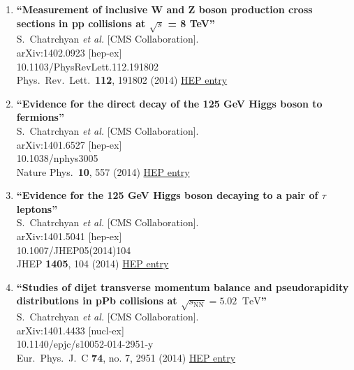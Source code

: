 \documentclass{article}
\begin{document}
\begin{enumerate}
\item%
{\bf ``Measurement of inclusive W and Z boson production cross sections in pp collisions at $\sqrt{s}$ = 8 TeV''}
  \\{}S.~Chatrchyan {\it et al.} [CMS Collaboration].
  \\{}arXiv:1402.0923 [hep-ex]
    \\{}10.1103/PhysRevLett.112.191802
\\{}Phys.\ Rev.\ Lett.\  {\bf 112}, 191802 (2014) %
\href{http://inspirehep.net/record/1280200}{HEP entry}


\item%
{\bf ``Evidence for the direct decay of the 125 GeV Higgs boson to fermions''}
  \\{}S.~Chatrchyan {\it et al.} [CMS Collaboration].
  \\{}arXiv:1401.6527 [hep-ex]
    \\{}10.1038/nphys3005
\\{}Nature Phys.\  {\bf 10}, 557 (2014) %
\href{http://inspirehep.net/record/1278857}{HEP entry}


\item%
{\bf ``Evidence for the 125 GeV Higgs boson decaying to a pair of $\tau$ leptons''}
  \\{}S.~Chatrchyan {\it et al.} [CMS Collaboration].
  \\{}arXiv:1401.5041 [hep-ex]
    \\{}10.1007/JHEP05(2014)104
\\{}JHEP {\bf 1405}, 104 (2014) %
\href{http://inspirehep.net/record/1278199}{HEP entry}


\item%
{\bf ``Studies of dijet transverse momentum balance and pseudorapidity distributions in pPb collisions at $\sqrt{s_{\mathrm{NN}}} = 5.02$ $\,\text {TeV}$''}
  \\{}S.~Chatrchyan {\it et al.} [CMS Collaboration].
  \\{}arXiv:1401.4433 [nucl-ex]
    \\{}10.1140/epjc/s10052-014-2951-y
\\{}Eur.\ Phys.\ J.\ C {\bf 74}, no. 7, 2951 (2014) %
\href{http://inspirehep.net/record/1278063}{HEP entry}



\end{enumerate}
\end{document}
